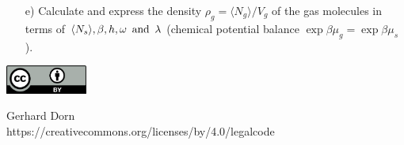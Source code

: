 \documentclass[12pt,a4paper]{article} %
\begin{document}
    \begin{enumerate}
    \item[e)] Calculate and express the density $\rho_g = \langle N_g \rangle / V_g$ of the gas molecules in terms of $\langle N_s \rangle, \beta, h, \omega \text{\, and \,} \lambda$ (chemical potential balance $\exp{\beta\mu_g} = \exp{\beta\mu_s}$).
\end{enumerate}








\vspace{2cm}
\begin{minipage}[t]{1\textwidth}
	\raggedleft
	\centering
	\includegraphics[width = 0.20\textwidth]{CC-BY_icon}
	\vspace{0.2cm}
	
	\centering
	{\Large Gerhard Dorn} \\
	https://creativecommons.org/licenses/by/4.0/legalcode
\end{minipage}
\end{document}
